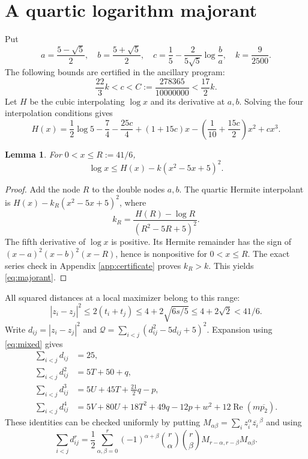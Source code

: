 \documentclass[11pt]{article}
\newtheorem{lemma}[theorem]{Lemma}
\theoremstyle{remark}
\newcommand{\Rea}{\operatorname{Re}}
\numberwithin{equation}{section}
\begin{document}
\section{A quartic logarithm majorant}
Put
\begin{equation}\label{eq:majorant-constants}
 a=\frac{5-\sqrt5}{2},\quad b=\frac{5+\sqrt5}{2},\quad
 c=\frac15-\frac{2}{5\sqrt5}\log\frac ba,\quad k=\frac9{2500}.
\end{equation}
The following bounds are certified in the ancillary program:
\begin{equation}\label{eq:c-bounds}
 \frac{22}{3}k<c<C:=\frac{278365}{10000000}<\frac{17}{2}k.
\end{equation}
Let $H$ be the cubic interpolating $\log x$ and its derivative at $a,b$.
Solving the four interpolation conditions gives
\begin{equation}\label{eq:H}
 H(x)=\frac12\log5-\frac74-\frac{25c}{4}
 +(1+15c)x-\left(\frac1{10}+\frac{15c}{2}\right)x^2+cx^3.
\end{equation}

\begin{lemma}\label{lem:majorant}
For $0<x\le R:=41/6$,
\begin{equation}\label{eq:majorant}
 \log x\le H(x)-k(x^2-5x+5)^2.
\end{equation}
\end{lemma}
\begin{proof}
Add the node $R$ to the double nodes $a,b$.
The quartic Hermite interpolant is
$H(x)-k_R(x^2-5x+5)^2$, where
\[
 k_R=\frac{H(R)-\log R}{(R^2-5R+5)^2}.
\]
The fifth derivative of $\log x$ is positive.
Its Hermite remainder has the sign of
$(x-a)^2(x-b)^2(x-R)$, hence is nonpositive for $0<x\le R$.
The exact series check in Appendix \ref{app:certificate} proves
$k_R>k$. This yields \eqref{eq:majorant}.
\end{proof}

All squared distances at a local maximizer belong to this range:
\[
 |z_i-z_j|^2\le2(t_i+t_j)
 \le4+2\sqrt{6s/5}\le4+2\sqrt2<41/6.
\]
Write $d_{ij}=|z_i-z_j|^2$ and
$\mathcal Q=\sum_{i<j}(d_{ij}^2-5d_{ij}+5)^2$.
Expansion using \eqref{eq:mixed} gives
\begin{equation}\label{eq:distance-moments}
\begin{aligned}
 \sum_{i<j}d_{ij}&=25,\\
 \sum_{i<j}d_{ij}^2&=5T+50+q,\\
 \sum_{i<j}d_{ij}^3&=5U+45T+\frac{21}{2}q-p,\\
 \sum_{i<j}d_{ij}^4&=5V+80U+18T^2+49q-12p+w^2
                 +12\Rea(m\overline{p_2}).
\end{aligned}
\end{equation}
These identities can be checked uniformly by putting
$M_{\alpha\beta}=\sum_i z_i^\alpha\overline{z_i}^{\,\beta}$ and using
\begin{equation}\label{eq:moment-expansion}
 \sum_{i<j}d_{ij}^r=
 \frac12\sum_{\alpha,\beta=0}^r(-1)^{\alpha+\beta}
 \binom r\alpha\binom r\beta
 M_{r-\alpha,r-\beta}M_{\alpha\beta}.
\end{equation}
\end{document}
